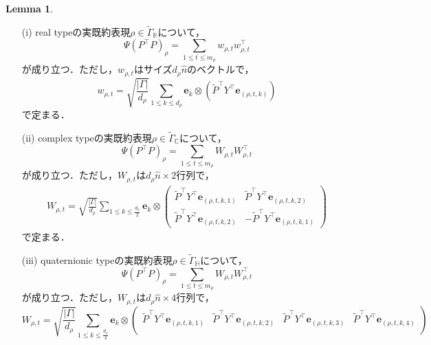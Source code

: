 \documentclass[11pt]{article}
\theoremstyle{definition}
\newtheorem{lemma}[defi]{Lemma}
\begin{document}
    \begin{lemma}\label{lem:cal2}
        \begin{itemize}
            \item[(i)] real typeの実既約表現$\rho \in \tilde{\Gamma}_\mathbb{R}$について，
            \[
                \Psi(P^\top P)_\rho = \sum_{1 \leq t \leq m_\rho} w_{\rho,t} w_{\rho,t}^\top
            \]
            が成り立つ．ただし，$w_{\rho,t}$はサイズ$d_\rho \hat{n}$のベクトルで，
            \[
                w_{\rho,t}= \sqrt{\frac{|\Gamma|}{d_\rho}} \sum_{1 \leq k \leq d_\rho} \bm{e}_k \otimes (\tilde{P}^\top Y^\top \bm{e}_{(\rho,t,k)})
            \]
            で定まる．
            \item[(ii)] complex typeの実既約表現$\rho \in \tilde{\Gamma}_\mathbb{C}$について，
            \[
                \Psi(P^\top P)_\rho = \sum_{1 \leq t \leq m_\rho} W_{\rho,t} W_{\rho,t}^\top
            \]
            が成り立つ．ただし，$W_{\rho,t}$は$d_\rho \hat{n}\times 2$行列で，
            \begin{align*}
                W_{\rho,t} = \sqrt{\frac{|\Gamma|}{d_\rho}} \sum_{1 \leq k \leq \frac{d_\rho}{2}} \bm{e}_k \otimes 
                \begin{pmatrix}
                    \tilde{P}^\top Y^\top \bm{e}_{(\rho,t,k,1)} & \tilde{P}^\top Y^\top \bm{e}_{(\rho,t,k,2)} \\
                    \tilde{P}^\top Y^\top \bm{e}_{(\rho,t,k,2)} &-\tilde{P}^\top Y^\top \bm{e}_{(\rho,t,k,1)}
                \end{pmatrix} 
            \end{align*}
            で定まる．
            \item[(iii)] quaternionic typeの実既約表現$\rho \in \tilde{\Gamma}_\mathbb{H}$について，
            \[
                \Psi(P^\top P)_\rho = \sum_{1 \leq t \leq m_\rho} W_{\rho,t} W_{\rho,t}^\top
            \]
            が成り立つ．ただし，$W_{\rho,t}$は$d_\rho \hat{n} \times 4$行列で，
            \[
                W_{\rho,t}= \sqrt{\frac{|\Gamma|}{d_\rho}} \sum_{1 \leq k \leq \frac{d_\rho}{4}} \bm{e}_k \otimes 
                \begin{pmatrix}
                    \tilde{P}^\top Y^\top \bm{e}_{(\rho,t,k,1)} & \tilde{P}^\top Y^\top \bm{e}_{(\rho,t,k,2)} & \tilde{P}^\top Y^\top \bm{e}_{(\rho,t,k,3)} & \tilde{P}^\top Y^\top \bm{e}_{(\rho,t,k,4)} \\

\end{pmatrix}\]
\end{itemize}
\end{lemma}
\end{document}
